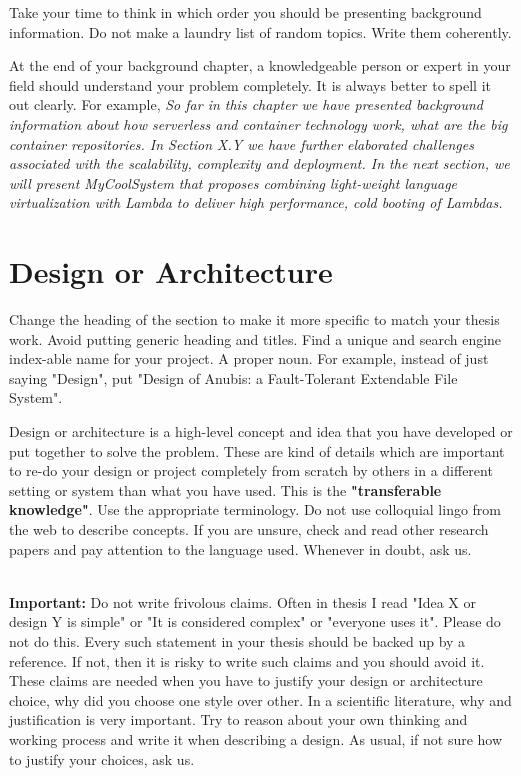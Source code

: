 \documentclass[11pt]{article}
\begin{document}
Take your time to think in which order you should be presenting background information. Do not make a laundry list of random topics. Write them coherently. 

At the end of your background chapter, a knowledgeable person or expert in your field should understand your problem completely. It is always better to spell it out clearly. For example, \textit{So far in this chapter we have presented background information about how serverless and container technology work, what are the big container repositories. In Section X.Y we have further elaborated challenges associated with the scalability, complexity and deployment. In the next section, we will present MyCoolSystem that proposes combining light-weight language virtualization with Lambda to deliver high performance, cold booting of Lambdas.}

\newpage 
\section{Design or Architecture}
Change the heading of the section to make it more specific to match your thesis work. Avoid putting generic heading and titles. Find a unique and search engine index-able name for your project. A proper noun. For example, instead of just saying "Design", put "Design of Anubis: a Fault-Tolerant  Extendable File System". 

Design or architecture is a high-level concept and idea that you have developed or put together to solve the problem. These are kind of details which are important to re-do your design or project completely from scratch by others in a different setting or system than what you have used. This is the \textbf{"transferable knowledge"}. Use the appropriate terminology. Do not use colloquial lingo from the web to describe concepts. If you are unsure, check and read other research papers and pay attention to the language used. Whenever in doubt, ask us. 


$ $\\

\noindent\textbf{Important:} Do not write frivolous claims. Often in thesis I read "Idea X or design Y is simple" or "It is considered complex" or "everyone uses it". Please do not do this. Every such statement in your thesis should be backed up by a reference. If not, then it is risky to write such claims and you should avoid it. These claims are needed when you have to justify your design or architecture choice, why did you choose one style over other. In a scientific literature, why and justification is very important. Try to reason about your own thinking and working process and write it when describing a design. As usual, if not sure how to justify your choices, ask us. 
\end{document}
